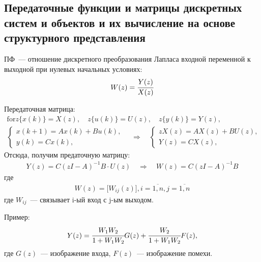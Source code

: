 \subsection{Передаточные функции и матрицы дискретных систем и объектов и их вычисление на основе структурного представления}

ПФ~--- отношение дискретного преобразования Лапласа входной переменной к выходной при нулевых начальных условиях:
\begin{equation}
    W(z) = \cfrac{Y(z)}{X(z)}
\end{equation}

Передаточная матрица:
\begin{gather}
    \text{for} z\{x(k)\} = X(z), \quad z\{u(k)\} = U(z), \quad z\{y(k)\} = Y(z), \\
    \begin{cases}
        x(k+1) = A x(k) + B u(k),\\
        y(k) = C x(k),
    \end{cases}
    \quad\Rightarrow\quad
    \begin{cases}
        z X(z) = A X(z) + B U(z),\\
        Y(z) = C X(z),
    \end{cases}
\end{gather}
Отсюда, получим предаточную матрицу:
\begin{gather}
    Y(z) = C(z I - A)^{-1} B \cdot U(z)
    \quad\Rightarrow\quad
    W(z) = C(z I - A)^{-1} B
\end{gather}
где
\begin{gather}
    W(z) = \Big[ W_{ij}(z) \Big], i=\overline{1,n}, j=\overline{1,n}
\end{gather}
где $W_{ij}$~--- связывает i-ый вход с j-ым выходом.

Пример:
\begin{equation}
    Y(z) = \cfrac{W_1 W_2}{1+W_1 W_2} G(z) + \cfrac{W_2}{1+W_1 W_2} F(z),
\end{equation}
где $G(z)$~--- изображение входа, $F(z)$~--- изображение помехи.